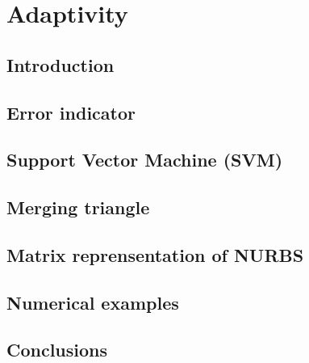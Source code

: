 
\chapter{Adaptivity}

\section{Introduction}

\section{Error indicator}


\section{Support Vector Machine (SVM)}



\section{Merging triangle}
\label{adap_merge_triangle}




\section{Matrix reprensentation of NURBS}
\label{adap_sec_mrep2d}



\section{Numerical examples}

\section{Conclusions}


